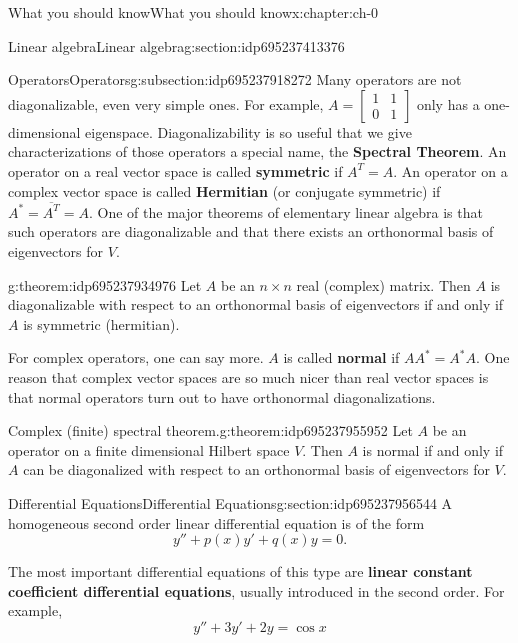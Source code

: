 \documentclass[oneside,10pt,]{book}
\newcommand{\terminology}[1]{\textbf{#1}}
\numberwithin{equation}{section}
\newcommand{\cc}[1]{\overline{#1}}
\newcommand{\ad}{^\ast}
\newcommand\bbm{\begin{bmatrix}}
\newcommand\ebm{\end{bmatrix}}
\numberwithin{equation}{section}
\newcommand{\amp}{&}
\begin{document}
\begin{chapterptx}{What you should know}{}{What you should know}{}{}{x:chapter:ch-0}
\begin{sectionptx}{Linear algebra}{}{Linear algebra}{}{}{g:section:idp695237413376}
\begin{subsectionptx}{Operators}{}{Operators}{}{}{g:subsection:idp695237918272}
Many operators are not diagonalizable, even very simple ones. For example, \(A = \bbm 1 \amp 1 \\ 0 \amp 1 \ebm\) only has a one-dimensional eigenspace. Diagonalizability is so useful that we give characterizations of those operators a special name, the \terminology{Spectral Theorem}. An operator on a real vector space is called \terminology{symmetric} if \(A^T = A\). An operator on a complex vector space is called \terminology{Hermitian} (or conjugate symmetric) if \(A\ad = \cc{A^T} = A\). One of the major theorems of elementary linear algebra is that such operators are diagonalizable and that there exists an orthonormal basis of eigenvectors for \(V\).%
\begin{theorem}{}{}{g:theorem:idp695237934976}%
Let \(A\) be an \(n \times n\) real (complex) matrix. Then \(A\) is diagonalizable with respect to an orthonormal basis of eigenvectors if and only if \(A\) is symmetric (hermitian).%
\end{theorem}
For complex operators, one can say more. \(A\) is called \terminology{normal} if \(A A\ad = A\ad A\). One reason that complex vector spaces are so much nicer than real vector spaces is that normal operators turn out to have orthonormal diagonalizations.%
\begin{theorem}{Complex (finite) spectral theorem.}{}{g:theorem:idp695237955952}%
Let \(A\) be an operator on a finite dimensional Hilbert space \(V\). Then \(A\) is normal if and only if \(A\) can be diagonalized with respect to an orthonormal basis of eigenvectors for \(V\).%
\end{theorem}
\end{subsectionptx}
\end{sectionptx}
%
%
\typeout{************************************************}
\typeout{************************************************}
%
\begin{sectionptx}{Differential Equations}{}{Differential Equations}{}{}{g:section:idp695237956544}
A homogeneous second order linear differential equation is of the form%
\begin{equation*}
y'' + p(x) y' + q(x) y = 0.
\end{equation*}
%
\par
The most important differential equations of this type are \terminology{linear constant coefficient differential equations}, usually introduced in the second order. For example,%
\begin{equation*}
y'' + 3 y' + 2 y = \cos x

\end{equation*}
\end{sectionptx}
\end{chapterptx}
\end{document}

